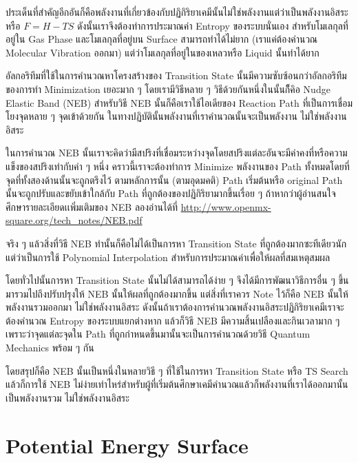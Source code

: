 ประเด็นที่สำคัญอีกอันก็คือพลังงานที่เกี่ยวข้องกับปฏิกิริยาเคมีนั้นไม่ใช่พลังงานแต่ว่าเป็นพลังงานอิสระหรือ $F = H - TS$ 
ดังนั้นเราจึงต้องทำการประมาณค่า Entropy ของระบบนั่นเอง สำหรับโมเลกุลที่อยู่ใน Gas Phase 
และโมเลกุลที่อยู่บน Surface สามารถทำได้ไม่ยาก (เราแค่ต้องคำนวณ Molecular Vibration ออกมา) 
แต่ว่าโมเลกุลที่อยู่ในของเหลวหรือ Liquid นั้นทำได้ยาก

อัลกอริทึมที่ใช้ในการคำนวณหาโครงสร้างของ Transition State นั้นมีความซับซ้อนกว่าอัลกอริทึมของการทำ 
Minimization เยอะมาก ๆ โดยเรามีวิธีหลาย ๆ วิธีด้วยกันหนึ่งในนั้นก็ึคิอ Nudge Elastic Band (NEB) 
สำหรับวิธี NEB นั้นก็คือเราใช้ไอเดียของ Reaction Path ที่เป็นการเชื่อมโยงจุดหลาย ๆ จุดเข้าด้วยกัน 
ในทางปฏิบัตินั้นพลังงานที่เราคำนวณนั้นจะเป็นพลังงาน ไม่ใช่พลังงานอิสระ

ในการคำนวณ NEB นั้นเราจะคิดว่ามีสปริงที่เชื่อมระหว่างจุดโดยสปริงแต่ละอันจะมีค่าคงที่หรือความแข็งของสปริงเท่ากับค่า ๆ หนึ่ง 
คราวนี้เราจะต้องทำการ Minimize พลังงานของ Path ทั้งหมดโดยที่จุดที่ทั้งสองด้านนั้นจะถูกตรึงไว้ ตามหลักการนั้น 
(ตามอุดมคติ) Path เริ่มต้นหรือ original Path นั้นจะถูกปรับและขยับเข้าใกล้กับ Path ที่ถูกต้องของปฏิกิริยามากขึ้นเรื่อย ๆ 
ถ้าหากว่าผู้อ่านสนใจศึกษารายละเอียดเเพิ่มเติมของ NEB ลองอ่านได้ที่ 
\url{http://www.openmx-square.org/tech_notes/NEB.pdf}

จริง ๆ แล้วสิ่งที่วิธี NEB ทำนั้นก็คือไม่ได้เป็นการหา Transition State ที่ถูกต้องมากซะทีเดียวนักแต่ว่าเป็นการใช้ 
Polynomial Interpolation สำหรับการประมาณค่าเพื่อให้ผลที่สมเหตุสมผล 

โดยทั่วไปนั้นการหา Transition State นั้นไม่ได้สามารถได้ง่าย ๆ จึงได้มีการพัฒนาวิธีการอื่น ๆ ขึ้นมารวมไปถึงปรับปรุงให้ 
NEB นั้นให้ผลที่ถูกต้องมากขึ้น แต่สิ่งที่เราควร Note ไว้ก็คือ NEB นั้นให้พลังงานรวมออกมา ไม่ใช่พลังงานอิสระ 
ดังนั้นถ้าเราต้องการคำนวณพลังงานอิสระปฏิกิริยาเคมีเราจะต้องคำนวณ Entropy ของระบบแยกต่างหาก 
แล้วก็วิธี NEB มีความสิ้นเปลืองและกินเวลามาก ๆ เพราะว่าจุดแต่ละจุดใน Path ที่ถูกกำหนดขึ้นมานั้นจะเป็นการคำนวณด้วยวิธี 
Quantum Mechanics พร้อม ๆ กัน 

โดยสรุปก็คือ NEB นั้นเป็นหนึ่งในหลายวิธี ๆ ที่ใช้ในการหา Transition State หรือ TS Search แล้วก็การใช้ NEB 
ไม่ง่ายเท่าไหร่สำหรับผู้ที่เริ่มต้นศึกษาเคมีคำนวณแล้วก็พลังงานที่เราได้ออกมานั้นเป็นพลังงานรวม ไม่ใช่พลังงานอิสระ 

\section{Potential Energy Surface}

